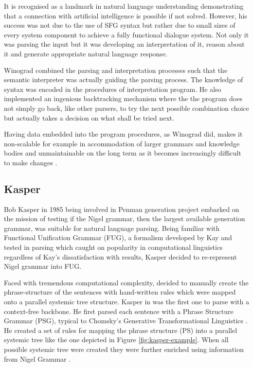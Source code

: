 It is recognised as a landmark in natural language understanding demonstrating that a connection with artificial intelligence is possible if not solved. However, his success was not due to the use of SFG syntax but rather due to small sizes of every system component to achieve a fully functional dialogue system. Not only it was parsing the input but it was developing an interpretation of it, reason about it and generate appropriate natural language response. 

Winograd combined the parsing and interpretation processes such that the semantic interpreter was actually guiding the parsing process. The knowledge of syntax was encoded in the procedures of interpretation program. He also implemented an ingenious backtracking mechanism where the the program does not simply go back, like other parsers, to try the next possible combination choice but actually takes a decision on what shall be tried next.  

Having data embedded into the program procedures, as Winograd did, makes it non-scalable for example in accommodation of larger grammars and knowledge bodies and unmaintainable on the long term as it becomes increasingly difficult to make changes \citep{Weerasinghe1994}.

\subsection{Kasper}
Bob Kasper in 1985 being involved in Penman generation project embarked on the mission of testing if the Nigel grammar, then the largest available generation grammar, was suitable for natural language parsing. Being familiar with Functional Unification Grammar (FUG), a formalism developed by Kay and tested in parsing \citep{Kay1985} which caught on popularity in computational linguistics regardless of Kay's dissatisfaction with results, Kasper decided to re-represent Nigel grammar into FUG. 

Faced with tremendous computational complexity, \citet{Kasper1988} decided to manually create the phrase-structure of the sentences with hand-written rules which were mapped onto a parallel systemic tree structure. Kasper in \citeyear{Kasper1988} was the first one to parse with a context-free backbone. He first parsed each sentence with a Phrase Structure Grammar (PSG), typical to Chomsky's Generative Transformational Linguistics \citet{Chomsky1957}. He created a set of rules for mapping the phrase structure (PS) into a parallel systemic tree like the one depicted in Figure \ref{fig:kasper-example}. When all possible systemic tree were created they were further enriched using information from Nigel Grammar \citep{Matthiessen1985}.

